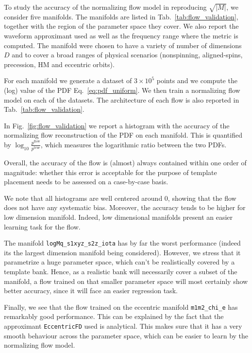 \documentclass[twocolumn,showpacs,preprintnumbers,nofootinbib,prd,
superscriptaddress,10pt]{revtex4-2}
\begin{document}
To study the accuracy of the normalizing flow model in reproducing $\sqrt{|M|}$, we consider five manifolds. The manifolds are listed in Tab.~\ref{tab:flow_validation}, together with the region of the parameter space they cover. We also report the waveform approximant used as well as the frequency range where the metric is computed.
The manifold were chosen to have a variety of number of dimensions $D$ and to cover a broad ranges of physical scenarios (nonspinning, aligned-spins, precession, HM and eccentric orbits).

For each manifold we generate a dataset of $3\times 10^5$ points and we compute the (log) value of the PDF Eq.~\eqref{eq:pdf_uniform}. We then train a normalizing flow model on each of the datasets.
The architecture of each flow is also reported in Tab.~\ref{tab:flow_validation}.

In Fig.~\ref{fig:flow_validation} we report a histogram with the accuracy of the normalizing flow reconstruction of the PDF on each manifold. This is quantified by $\log_{10}\frac{p^\mathrm{flow}}{p^\mathrm{true}}$, which measures the logarithmic ratio between the two PDFs.

Overall, the accuracy of the flow is (almost) always contained within one order of magnitude: whether this error is acceptable for the purpose of template placement needs to be assessed on a case-by-case basis.

We note that all histograms are well centered around $0$, showing that the flow does not have any systematic bias. Moreover, the accuracy tends to be higher for low dimension manifold. Indeed, low dimensional manifolds present an easier learning task for the flow.

The manifold \texttt{logMq\_s1xyz\_s2z\_iota} has by far the worst performance (indeed its the largest dimension manifold being considered). However, we stress that it parametrize a huge parameter space, which can't be realistically covered by a template bank. Hence, as a realistic bank will necessarily cover a subset of the manifold, a flow trained on that smaller parameter space will most certainly show better accuracy, since it will face an easier regression task.

Finally, we see that the flow trained on the eccentric manifold \texttt{m1m2\_chi\_e} has remarkably good performance. This can be explained by the fact that the approximant \texttt{EccentricFD} \cite{lalsuite} used is analytical. This makes sure that it has a very smooth behaviour across the parameter space, which can be easier to learn by the normalizing flow model.
\end{document}
